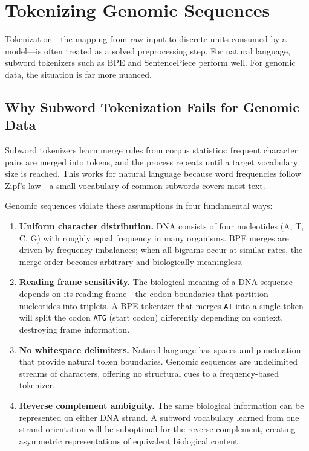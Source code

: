 \section{Tokenizing Genomic Sequences}
\label{sec:tokenization}

Tokenization---the mapping from raw input to discrete units consumed by a model---is often treated as a solved preprocessing step. For natural language, subword tokenizers such as BPE \citep{sennrich2016} and SentencePiece \citep{kudo2018} perform well. For genomic data, the situation is far more nuanced.

\subsection{Why Subword Tokenization Fails for Genomic Data}

Subword tokenizers learn merge rules from corpus statistics: frequent character pairs are merged into tokens, and the process repeats until a target vocabulary size is reached. This works for natural language because word frequencies follow Zipf's law---a small vocabulary of common subwords covers most text.

Genomic sequences violate these assumptions in four fundamental ways:

\begin{enumerate}[leftmargin=1.8em]
  \item \textbf{Uniform character distribution.} DNA consists of four nucleotides (A, T, C, G) with roughly equal frequency in many organisms. BPE merges are driven by frequency imbalances; when all bigrams occur at similar rates, the merge order becomes arbitrary and biologically meaningless.

  \item \textbf{Reading frame sensitivity.} The biological meaning of a DNA sequence depends on its reading frame---the codon boundaries that partition nucleotides into triplets. A BPE tokenizer that merges \texttt{AT} into a single token will split the codon \texttt{ATG} (start codon) differently depending on context, destroying frame information.

  \item \textbf{No whitespace delimiters.} Natural language has spaces and punctuation that provide natural token boundaries. Genomic sequences are undelimited streams of characters, offering no structural cues to a frequency-based tokenizer.

  \item \textbf{Reverse complement ambiguity.} The same biological information can be represented on either DNA strand. A subword vocabulary learned from one strand orientation will be suboptimal for the reverse complement, creating asymmetric representations of equivalent biological content.
\end{enumerate}

